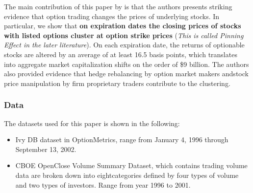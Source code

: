 \documentclass[10pt]{report}
\begin{document}
The main contribution of this paper by \citet{XIAOYANNI2005StockPC} is that the authors presents striking evidence that option trading changes the prices of underlying stocks.
In particular, we show that \textbf{on expiration dates the closing prices of stocks with listed options cluster at option strike prices} (\textit{This is called Pinning Effect in the later literature}). On each expiration date, the returns of optionable stocks are altered by an average of at least 16.5 basis points, which translates into aggregate market capitalization shifts on the order of \$9 billion. The authors also provided evidence that hedge rebalancing by option market makers andstock price manipulation by firm proprietary traders contribute to the clustering.

\subsubsection{Data}
The datasets used for this paper is shown in the following:
\begin{itemize}
    \item Ivy DB dataset in OptionMetrics, range from January 4, 1996 through September 13, 2002.
    \item CBOE OpenClose Volume Summary Dataset, which contains trading volume data are broken down into eightcategories defined by four types of volume and two types of investors. Range from year 1996 to 2001.
\end{itemize}
\end{document}
